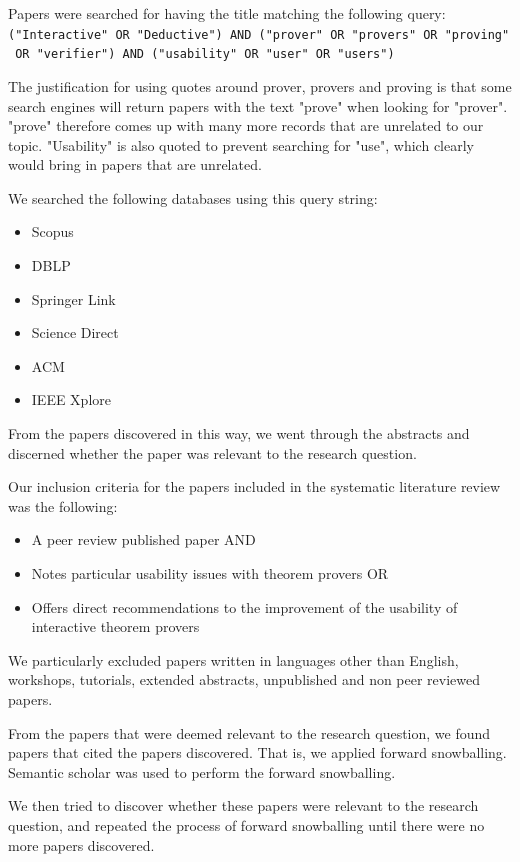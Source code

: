 \documentclass[
]{article}
\providecommand{\tightlist}{%
  \setlength{\itemsep}{0pt}\setlength{\parskip}{0pt}}
\begin{document}
Papers were searched for having the title matching the following query:
\texttt{("Interactive"\ OR\ "Deductive")\ AND\ ("prover"\ OR\ "provers"\ OR\ "proving"\ OR\ "verifier")\ AND\ ("usability"\ OR\ "user"\ OR\ "users")}

The justification for using quotes around prover, provers and proving is
that some search engines will return papers with the text "prove" when
looking for "prover". "prove" therefore comes up with many more records
that are unrelated to our topic. "Usability" is also quoted to prevent
searching for "use", which clearly would bring in papers that are
unrelated.

We searched the following databases using this query string:

\begin{itemize}
\tightlist
\item
  Scopus
\item
  DBLP
\item
  Springer Link
\item
  Science Direct
\item
  ACM
\item
  IEEE Xplore
\end{itemize}

From the papers discovered in this way, we went through the abstracts
and discerned whether the paper was relevant to the research question.

Our inclusion criteria for the papers included in the systematic
literature review was the following:

\begin{itemize}
\tightlist
\item
  A peer review published paper AND
\item
  Notes particular usability issues with theorem provers OR
\item
  Offers direct recommendations to the improvement of the usability of
  interactive theorem provers
\end{itemize}

We particularly excluded papers written in languages other than English,
workshops, tutorials, extended abstracts, unpublished and non peer
reviewed papers.

From the papers that were deemed relevant to the research question, we
found papers that cited the papers discovered. That is, we applied
forward snowballing. Semantic scholar was used to perform the forward
snowballing.

We then tried to discover whether these papers were relevant to the
research question, and repeated the process of forward snowballing until
there were no more papers discovered.
\end{document}
